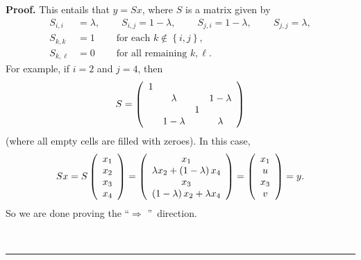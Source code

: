 \documentclass[numbers=enddot,12pt,final,onecolumn,notitlepage]{scrartcl}%
\numberwithin{exer}{subsection}
\theoremstyle{definition}
\newenvironment{proof}[1][Proof]{\noindent\textbf{#1.} }{\ \rule{0.5em}{0.5em}}
\begin{document}
\begin{proof}
This entails that $y=Sx$, where $S$ is a matrix given by%
\begin{align*}
S_{i,i}  & =\lambda,\ \ \ \ \ \ \ \ \ \ S_{i,j}=1-\lambda
,\ \ \ \ \ \ \ \ \ \ S_{j,i}=1-\lambda,\ \ \ \ \ \ \ \ \ \ S_{j,j}=\lambda,\\
S_{k,k}  & =1\ \ \ \ \ \ \ \ \ \ \text{for each }k\notin\left\{  i,j\right\}
,\\
S_{k,\ell}  & =0\ \ \ \ \ \ \ \ \ \ \text{for all remaining }k,\ell.
\end{align*}
For example, if $i=2$ and $j=4$, then
\[
S=\left(
\begin{array}
[c]{cccc}%
1 &  &  & \\
& \lambda &  & 1-\lambda\\
&  & 1 & \\
& 1-\lambda &  & \lambda
\end{array}
\right)
\]
(where all empty cells are filled with zeroes). In this case,%
\[
Sx=S\left(
\begin{array}
[c]{c}%
x_{1}\\
x_{2}\\
x_{3}\\
x_{4}%
\end{array}
\right)  =\left(
\begin{array}
[c]{c}%
x_{1}\\
\lambda x_{2}+\left(  1-\lambda\right)  x_{4}\\
x_{3}\\
\left(  1-\lambda\right)  x_{2}+\lambda x_{4}%
\end{array}
\right)  =\left(
\begin{array}
[c]{c}%
x_{1}\\
u\\
x_{3}\\
v
\end{array}
\right)  =y.
\]
So we are done proving the \textquotedblleft$\Longrightarrow$%
\textquotedblright\ direction.


\end{proof}
\end{document}
